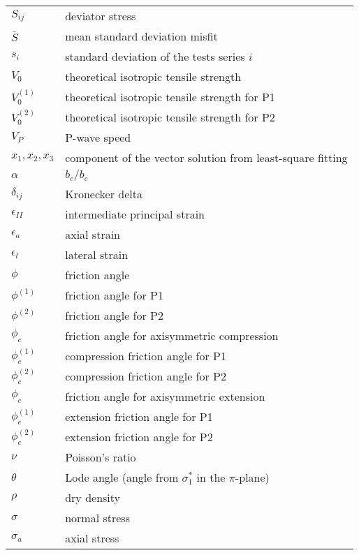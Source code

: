 \begin{table}
    \begin{tabular}{ll}
        $S_{ij}$ & deviator stress \\
        $\bar{S}$ & mean standard deviation misfit \\
        $s_i$ & standard deviation of the tests series $i$ \\
        $V_0$ & theoretical isotropic tensile strength \\
        $V_0^{(1)}$ & theoretical isotropic tensile strength for P1 \\
        $V_0^{(2)}$ & theoretical isotropic tensile strength for P2 \\
        $V_P$ & P-wave speed \\
        $x_1, x_2, x_3$ & component of the vector solution from least-square fitting\\
        $\alpha$ & $b_c/b_e$ \\
        $\delta_{ij}$ & Kronecker delta \\
        $\epsilon_{II}$ & intermediate principal strain \\
        $\epsilon_a$ & axial strain \\
        $\epsilon_l$ & lateral strain \\
        $\phi$ & friction angle \\
        $\phi^{(1)}$ & friction angle for P1 \\
        $\phi^{(2)}$ & friction angle for P2 \\
        $\phi_c$ & friction angle for axisymmetric compression \\
        $\phi_c^{(1)}$ & compression friction angle for P1 \\
        $\phi_c^{(2)}$ & compression friction angle for P2 \\
        $\phi_e$ & friction angle for axisymmetric extension \\
        $\phi_e^{(1)}$ & extension friction angle for P1 \\
        $\phi_e^{(2)}$ & extension friction angle for P2 \\
        $\nu$ & Poisson's ratio \\
        $\theta$ & Lode angle (angle from $\sigma_1^*$ in the $\pi$-plane) \\
        $\rho$ & dry density \\
        $\sigma$ & normal stress \\
        $\sigma_a$ & axial stress \\

\end{tabular}
\end{table}
